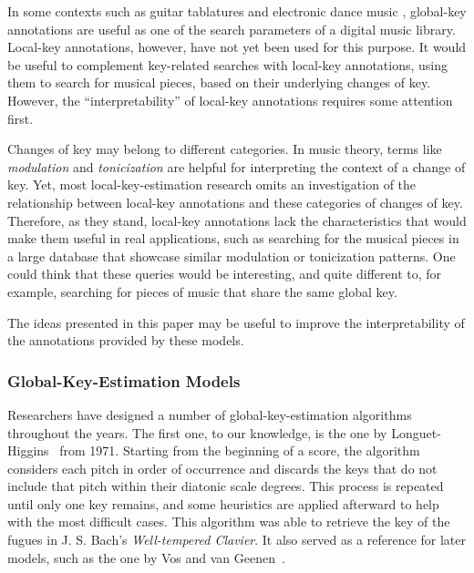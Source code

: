 In some contexts such as guitar tablatures \cite{ultimateguitar} and electronic dance music \cite{beatport}, global-key annotations are useful as one of the search parameters of a digital music library. 
Local-key annotations, however, have not yet been used for this purpose. 
It would be useful to complement key-related searches with local-key annotations, using them to search for musical pieces, based on their underlying changes of key. 
However, the ``interpretability'' of local-key annotations requires some attention first. 

Changes of key may belong to different categories. 
In music theory, terms like \emph{modulation} and \emph{tonicization} are helpful for interpreting the context of a change of key. 
Yet, most local-key-estimation research omits an investigation of the relationship between local-key annotations and these categories of changes of key. 
Therefore, as they stand, local-key annotations lack the characteristics that would make them useful in real applications, such as searching for the musical pieces in a large database that showcase similar modulation or tonicization patterns. 
One could think that these queries would be interesting, and quite different to, for example, searching for pieces of music that share the same global key. 

The ideas presented in this paper may be useful to improve the interpretability of the annotations provided by these models.



\subsubsection{Global-Key-Estimation Models}
Researchers have designed a number of global-key-estimation algorithms throughout the years. 
The first one, to our knowledge, is the one by Longuet-Higgins~\cite{longuet1971tonality} from 1971.
Starting from the beginning of a score, the algorithm considers each pitch in order of occurrence and discards the keys that do not include that pitch within their diatonic scale degrees. 
This process is repeated until only one key remains, and some heuristics are applied afterward to help with the most difficult cases. This algorithm was able to retrieve the key of the fugues in J. S. Bach's \emph{Well-tempered Clavier}. 
It also served as a reference for later models, such as the one by Vos and van Geenen~\cite{vos96keyfinding}.

